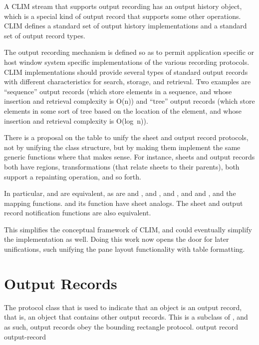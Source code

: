 A CLIM stream that supports output recording has an output history object, which
is a special kind of output record that supports some other operations.  CLIM
defines a standard set of output history implementations and a standard set of
output record types.

The output recording mechanism is defined so as to permit application specific
or host window system specific implementations of the various recording
protocols.  CLIM implementations should provide several types of standard output
records with different characteristics for search, storage, and retrieval.  Two
examples are ``sequence'' output records (which store elements in a sequence,
and whose insertion and retrieval complexity is O(n)) and ``tree'' output
records (which store elements in some sort of tree based on the location of the
element, and whose insertion and retrieval complexity is O(log~n)).

 {There is a proposal on the table to unify the sheet and
output record protocols, not by unifying the class structure, but by making them
implement the same generic functions where that makes sense.  For instance,
sheets and output records both have regions, transformations (that relate sheets
to their parents), both support a repainting operation, and so forth.

In particular,  and  are equivalent,
as are  and ,
 and ,  and
, and  and ,
and the mapping functions.   and its 
function have sheet analogs.  The sheet and output record notification functions
are also equivalent.

This simplifies the conceptual framework of CLIM, and could eventually simplify
the implementation as well.  Doing this work now opens the door for later
unifications, such unifying the pane layout functionality with table formatting.}


\section {Output Records}


The protocol class that is used to indicate that an object is an output record,
that is, an object that contains other output records.  This is a subclass of
, and as such, output records obey the bounding rectangle
protocol.
 {output record} {output-record}

